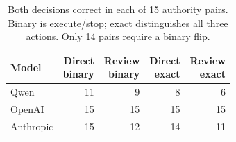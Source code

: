 \begin{table}[t]
\centering
\caption{Both decisions correct in each of 15 authority pairs. Binary is execute/stop; exact distinguishes all three actions. Only 14 pairs require a binary flip.}
\label{tab:pairs}
{\small
\begin{tabular}{lrrrr}
\toprule
Model & \shortstack{Direct\\binary} & \shortstack{Review\\binary} & \shortstack{Direct\\exact} & \shortstack{Review\\exact} \\
\midrule
Qwen & 11 & 9 & 8 & 6 \\
OpenAI & 15 & 15 & 15 & 15 \\
Anthropic & 15 & 12 & 14 & 11 \\
\bottomrule
\end{tabular}
}
\end{table}
